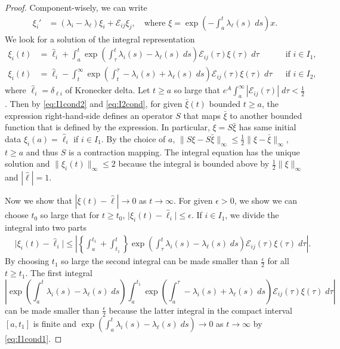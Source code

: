 \documentclass[a4paper,11pt]{article}
\theoremstyle{remark}
\begin{document}
\begin{proof}
Component-wisely, we can write
\begin{align*}
 \xi_i' & = (\lambda_i-\lambda_\ell)\xi_i + \mathcal{E}_{ij}\xi_j, \quad \text{where $\xi = \exp\left(-\int_a^t \lambda_\ell(s) \; ds\right)x$.}
\end{align*}
We look for a solution of the integral representation
\begin{align*}
 \xi_i(t) &= \hat\ell_i + \int_a^t \exp\left(\int_\tau^t \lambda_i(s)-\lambda_\ell(s) \; ds\right)\mathcal{E}_{ij}(\tau)\xi(\tau) \; d\tau && \text{if $i\in I_1$,}\\
 \xi_i(t) &= \hat\ell_i -\int_t^\infty \exp\left(\int_t^\tau -\lambda_i(s)+\lambda_\ell(s) \; ds\right)\mathcal{E}_{ij}(\tau)\xi(\tau) \; d\tau && \text{if $i\in I_2$,}
\end{align*}
where $\hat{\ell}_i = \delta_{\ell i}$ of Kronecker delta. Let $t\ge a$ so large that $e^A\int_a^\infty |\mathcal{E}_{ij}(\tau)|\; d\tau < \frac{1}{2}$. Then by \eqref{eq:I1cond2} and \eqref{eq:I2cond}, for given $\bar\xi(t)$ bounded $t\ge a$, the expression right-hand-side defines an operator $S$ that maps $\bar\xi$ to another bounded function that is defined by the expression. In particular, $\xi=S\bar\xi$ has same initial data $\xi_i(a) = \hat{\ell}_i$ if $i\in I_1$.
By the choice of $a$, $\|S\xi - S\bar\xi\|_\infty \le \frac{1}{2}\|\xi-\bar\xi\|_\infty$, $t\ge a$ and thus $S$ is a contraction mapping. The integral equation has the unique solution and $\|\xi_i(t)\|_\infty \le 2$ because the integral is bounded above by $ \frac{1}{2} \|\xi\|_\infty$ and $|\hat{\ell}|=1$.

Now we show that $|\xi(t)-\hat\ell| \rightarrow 0$ as $t \rightarrow \infty$. For given $\epsilon>0$, we show we can choose $t_0$ so large that for $t\ge t_0$, $\big|\xi_i(t)-\hat{\ell}_i\big| \le \epsilon$. If $i\in I_1$, we divide the integral into two parts
\begin{align*}
 &\big|\xi_i(t)-\hat{\ell}_i\big| \le \left|\left\{ \int_a^{t_1} + \int_{t_1}^t \right\} \exp\left(\int_\tau^t \lambda_i(s)-\lambda_\ell(s) \; ds\right)\mathcal{E}_{ij}(\tau)\xi(\tau) \; d\tau \right|.
\end{align*}
By choosing $t_1$ so large the second integral can be made smaller than $ \frac{\epsilon}{2}$ for all $t\ge t_1$. The first integral $$\left|\exp\left(\int_a^t \lambda_i(s)-\lambda_\ell(s) \; ds\right)\int_a^{t_1} \exp\left(\int_a^\tau -\lambda_i(s)+\lambda_\ell(s) \; ds\right)\mathcal{E}_{ij}(\tau)\xi(\tau) \; d\tau \right|$$
can be made smaller than $ \frac{\epsilon}{2}$ because the latter integral in the compact interval $[a, t_1]$ is finite and $\exp\left(\int_a^t \lambda_i(s)-\lambda_\ell(s) \; ds\right) \rightarrow 0$ as $t \rightarrow \infty$ by \eqref{eq:I1cond1}. 


\end{proof}
\end{document}
